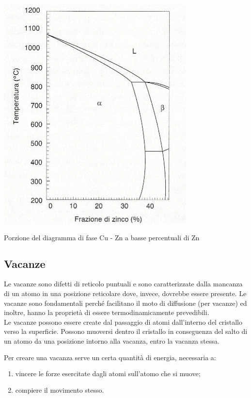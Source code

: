 \begin{marginfigure}[-5cm]
\includegraphics{images/img23.png}
\caption{Porzione del diagramma di fase Cu - Zn a basse percentuali di Zn}
\end{marginfigure}

\subsection{Vacanze}

Le vacanze sono difetti di reticolo puntuali e sono caratterizzate dalla mancanza di un atomo in una posizione reticolare dove, invece, dovrebbe essere presente. Le vacanze sono fondamentali perché facilitano il moto di diffusione (per vacanze) ed inoltre, hanno la proprietà di essere termodinamicamente prevedibili.\\
Le vacanze possono essere create dal passaggio di atomi dall’interno del cristallo verso la superficie. Possono muoversi dentro il cristallo in conseguenza del salto di un atomo da una posizione intorno alla vacanza, entro la vacanza stessa.

Per creare una vacanza serve un certa quantità di energia, necessaria a:
\begin{enumerate}
    \item vincere le forze esercitate dagli atomi sull'atomo che si muove;
    \item compiere il movimento stesso.
\end{enumerate}

